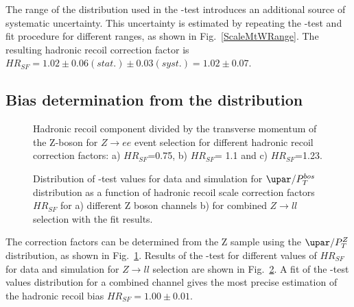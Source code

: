 The range of the \mtw distribution used in the \chiD-test introduces an additional source of systematic uncertainty. This uncertainty is estimated by repeating the \chiD-test and \chiD fit procedure for  different \mtw ranges, as shown in Fig.~\ref{ScaleMtWRange}. The resulting hadronic recoil correction factor is $HR_{SF}=1.02\pm0.06(stat.)\pm0.03(syst.)=1.02\pm0.07$. 


\subsection{Bias determination from the \upar distribution}




\begin{figure}[!tbp]
\endminipage\hfill
{}
\endminipage\hfill
{}%
\endminipage
\caption{Hadronic recoil component \upar divided by the transverse momentum of the Z-boson for $Z\to ee$ event selection for different hadronic recoil correction factors: a) $HR_{SF}$=0.75, b) $HR_{SF}$= 1.1 and c) $HR_{SF}$=1.23.}
\label{HadrRecoil:ZScan}
\end{figure}

\begin{figure}[!tbp]
\begin{minipage}[h]{0.49\linewidth}
\end{minipage}
\hfill
\begin{minipage}[h]{0.49\linewidth}
\end{minipage}
\caption{Distribution of \chiD-test values for  data and simulation for $\upar/P_T^{bos}$ distribution as a function of hadronic recoil scale correction factors $HR_{SF}$ for a) different Z boson channels 
b) for combined $Z \to ll$ selection with the \chiD fit results.}
\label{uPAr}
\end{figure}  
 
The correction factors can be determined from the Z sample using the $\upar/P_T^{Z}$ distribution, as shown in Fig.~\ref{HadrRecoil:ZScan}. Results of the \chiD-test for different values of $HR_{SF}$ for data and simulation for $Z\to ll$ selection are shown in Fig.~\ref{uPAr}. A \chiD fit of the \chiD-test values distribution for a combined channel  gives the most precise estimation of the hadronic recoil bias $HR_{SF} = 1.00 \pm 0.01$. 




